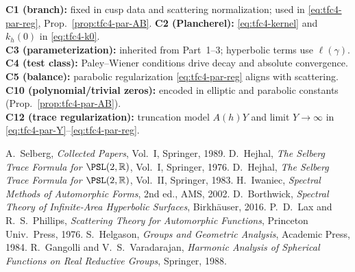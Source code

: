 \noindent
\textbf{C1 (branch):} fixed in cusp data and scattering normalization; used in \eqref{eq:tfc4-par-reg}, Prop.~\ref{prop:tfc4-par-AB}. \quad
\textbf{C2 (Plancherel):} \eqref{eq:tfc4-kernel} and $k_h(0)$ in \eqref{eq:tfc4-k0}. \\
\textbf{C3 (parameterization):} inherited from Part~1--3; hyperbolic terms use $\ell(\gamma)$. \quad
\textbf{C4 (test class):} Paley--Wiener conditions drive decay and absolute convergence. \\
\textbf{C5 (balance):} parabolic regularization \eqref{eq:tfc4-par-reg} aligns with scattering. \quad
\textbf{C10 (polynomial/trivial zeros):} encoded in elliptic and parabolic constants (Prop.~\ref{prop:tfc4-par-AB}). \\
\textbf{C12 (trace regularization):} truncation model $A(h)Y$ and limit $Y\to\infty$ in \eqref{eq:tfc4-par-Y}--\eqref{eq:tfc4-par-reg}.\relax\hspace{0pt}

\begin{thebibliography}{99} %
 A.~Selberg, \emph{Collected Papers}, Vol.~I, Springer, 1989. %
 D.~Hejhal, \emph{The Selberg Trace Formula for $\PSL(2,\mathbb{R})$}, Vol.~I, Springer, 1976. %
 D.~Hejhal, \emph{The Selberg Trace Formula for $\PSL(2,\mathbb{R})$}, Vol.~II, Springer, 1983. %
 H.~Iwaniec, \emph{Spectral Methods of Automorphic Forms}, 2nd ed., AMS, 2002. %
 D.~Borthwick, \emph{Spectral Theory of Infinite-Area Hyperbolic Surfaces}, Birkhäuser, 2016. %
 P.~D.~Lax and R.~S.~Phillips, \emph{Scattering Theory for Automorphic Functions}, Princeton Univ.\ Press, 1976. %
 S.~Helgason, \emph{Groups and Geometric Analysis}, Academic Press, 1984. %
 R.~Gangolli and V.~S.~Varadarajan, \emph{Harmonic Analysis of Spherical Functions on Real Reductive Groups}, Springer, 1988. %
\end{thebibliography}


